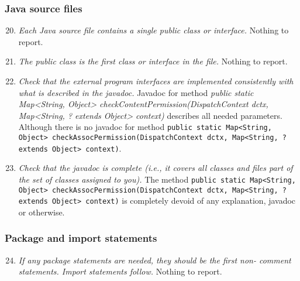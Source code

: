 	\subsubsection{Java source files}
		\begin{enumerate}
			\setcounter{enumi}{19}
			\item \textit{Each Java source file contains a single public class or interface.}\newline
			Nothing to report. %

			\item \textit{The public class is the first class or interface in the file.}\newline
			Nothing to report. %

			\item \textit{Check that the external program interfaces are implemented consistently with what is described in the javadoc.}
			Javadoc for method \textit{public static Map<String, Object> checkContentPermission(DispatchContext dctx, Map<String, ? extends Object> context)} describes all needed parameters. Although there is no javadoc for method  \texttt{public static Map<String, Object> checkAssocPermission(DispatchContext dctx, Map<String, ? extends Object> context)}.
	
			\item \textit{Check that the javadoc is complete (i.e., it covers all classes and files part of the set of classes assigned to you).}\newline
			The method \texttt{public static Map<String, Object> checkAssocPermission(DispatchContext dctx, Map<String, ? extends Object> context)} is completely devoid of any explanation, javadoc or otherwise. 

		\end{enumerate}

	\subsubsection{Package and import statements}
		\begin{enumerate}
			\setcounter{enumi}{23}
			\item \textit{If any package statements are needed, they should be the first non- comment statements. Import statements follow.}\newline
			Nothing to report. %

		\end{enumerate}


